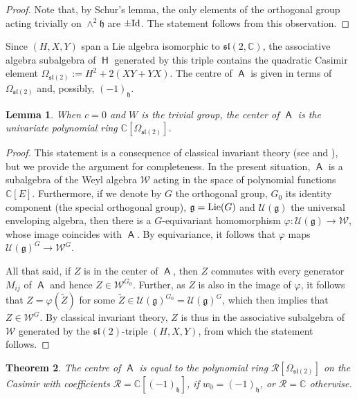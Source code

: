 \documentclass[pdftex]{sigma}
\numberwithin{equation}{section}
\newtheorem{Theorem}{Theorem}[section]
\newtheorem{Lemma}[Theorem]{Lemma}
\newcommand{\fg}{\mathfrak{g}}
\newcommand{\fh}{\mathfrak{h}}
\newcommand{\fl}{\mathfrak{l}}
\newcommand{\fs}{\mathfrak{s}}
\newcommand{\bbc}{\mathbb{C}}
\newcommand{\Cu}{\mathcal{U}}
\newcommand{\Cw}{\mathcal{W}}
\DeclareMathOperator{\rca}{\mathsf{H}}
\DeclareMathOperator{\ama}{\mathsf{A}}
\begin{document}
\begin{proof} Note that, by Schur's lemma, the only elements of the orthogonal group acting trivially on
$\wedge^2\mathfrak{h}$ are $\pm {\rm Id}$. The statement follows from this observation.
\end{proof}

Since $(H,X,Y)$ span a Lie algebra isomorphic to $\fs\fl(2,\bbc)$, the associative algebra subalgebra of $\rca$ generated by this triple contains the quadratic Casimir element $\Omega_{\fs\fl(2)} := H^2 +2(XY+YX)$. The centre of $\ama$ is given in terms of $\Omega_{\fs\fl(2)}$ and, possibly, $(-1)_\fh$.

\begin{Lemma}
When $c=0$ and $W$ is the trivial group, the center of $\ama$ is the univariate polynomial ring $\bbc[\Omega_{\fs\fl(2)}]$.
\end{Lemma}

\begin{proof}
This statement is a consequence of classical invariant theory (see \cite{H89} and \cite{W46}), but we provide the argument for completeness. In the present situation, $\ama$ is a subalgebra of the Weyl algebra $\Cw$ acting in the space of polynomial functions $\bbc[E]$. Furthermore, if we denote by $G$ the orthogonal group, $G_0$ its identity component (the special orthogonal group), $\fg=\textup{Lie}(G)$ and $\Cu(\fg)$ the universal enveloping algebra, then there is a $G$-equivariant homomorphism $\varphi\colon \Cu(\fg)\to \Cw$, whose image coincides with $\ama$. By equivariance, it follows that $\varphi$ maps $\Cu(\fg)^G\to\Cw^G$.

All that said,
if $Z$ is in the center of $\ama$, then $Z$ commutes with every generator $M_{ij}$ of $\ama$ and hence $Z\in \Cw^{G_0}$. Further, as $Z$ is also in the image of $\varphi$, it follows that $Z = \varphi(\tilde{Z})$ for some $\tilde{Z} \in \Cu(\fg)^{G_0} = \Cu(\fg)^{G}$, which then implies that $Z\in \Cw^G$. By classical invariant theory, $Z$ is thus in the associative subalgebra of $\Cw$ generated by the $\fs\fl(2)$-triple $(H,X,Y)$, from which the statement follows.
\end{proof}

\begin{Theorem}
The centre of $\ama$ is equal to the polynomial ring $\mathcal{R}[\Omega_{\fs\fl(2)}]$ on the Casimir with coefficients $\mathcal{R}= \mathbb{C}[(-1)_\fh]$, if $w_0=(-1)_\fh$, or $\mathcal{R}=\mathbb{C}$ otherwise.
\end{Theorem}
\end{document}

